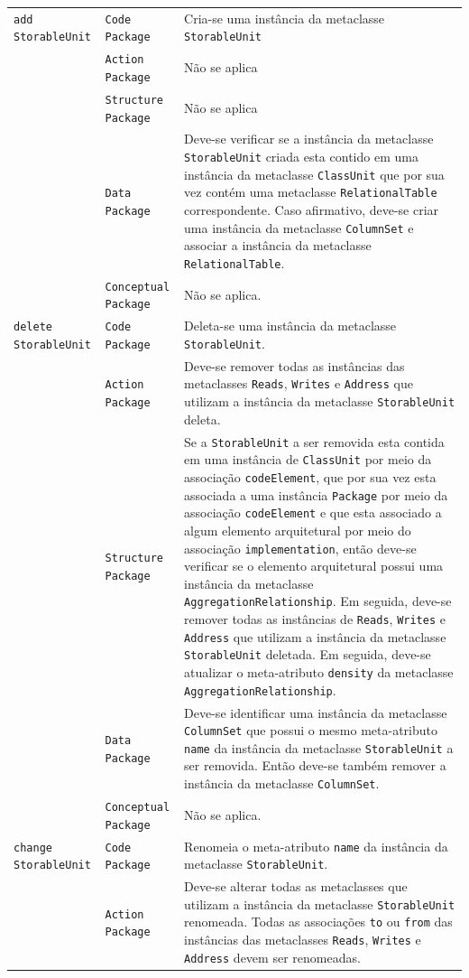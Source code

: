 \begin{longtable}{ | m{1.9cm} | m{3.57cm}| m{9.3cm} | }
 \texttt{add} \texttt{StorableUnit} & \texttt{Code Package} & Cria-se uma instância da metaclasse \texttt{StorableUnit}\tabularnewline
\cline{2-3} 
\cline{2-3} 
 & \texttt{Action Package} & Não se aplica \tabularnewline
 \cline{2-3} 
 & \texttt{Structure Package} & Não se aplica \tabularnewline
\cline{2-3} 
 & \texttt{Data Package} & Deve-se verificar se a instância da metaclasse \texttt{StorableUnit} criada esta contido em uma instância da metaclasse \texttt{ClassUnit} que por sua vez contém uma metaclasse \texttt{RelationalTable} correspondente. Caso afirmativo, deve-se criar uma instância da metaclasse \texttt{ColumnSet} e associar a instância da metaclasse \texttt{RelationalTable}. \tabularnewline
\cline{2-3} 
 & \texttt{Conceptual Package} & Não se aplica. \tabularnewline
\hline 
 \texttt{delete} \texttt{StorableUnit} & \texttt{Code Package} & Deleta-se uma instância da metaclasse \texttt{StorableUnit}.\tabularnewline
\cline{2-3} 
& \texttt{Action Package} & Deve-se remover todas as instâncias das metaclasses \texttt{Reads}, \texttt{Writes} e \texttt{Address} que utilizam a instância da metaclasse \texttt{StorableUnit} deleta. \tabularnewline
\cline{2-3}
& \texttt{Structure Package} & Se a \texttt{StorableUnit} a ser removida esta contida em uma instância de \texttt{ClassUnit} por meio da associação \texttt{codeElement}, que por sua vez esta associada a uma instância \texttt{Package} por meio da associação \texttt{codeElement} e que esta associado a algum elemento arquitetural por meio do associação \texttt{implementation}, então deve-se verificar se o elemento arquitetural possui uma instância da metaclasse \texttt{AggregationRelationship}. Em seguida, deve-se remover todas as instâncias de \texttt{Reads}, \texttt{Writes} e \texttt{Address} que utilizam a instância da metaclasse \texttt{StorableUnit} deletada. Em seguida, deve-se atualizar o meta-atributo \texttt{density} da metaclasse \texttt{AggregationRelationship}. \tabularnewline
\cline{2-3}
& \texttt{Data Package} & Deve-se identificar uma instância da metaclasse \texttt{ColumnSet} que possui o mesmo meta-atributo \texttt{name} da instância da metaclasse \texttt{StorableUnit} a ser removida. Então deve-se também remover a instância da metaclasse \texttt{ColumnSet}. \tabularnewline
\cline{2-3}
& \texttt{Conceptual Package} & Não se aplica. \tabularnewline
\hline
\texttt{change} \texttt{StorableUnit} & \texttt{Code Package} & Renomeia o meta-atributo \texttt{name} da instância da metaclasse \texttt{StorableUnit}.\tabularnewline
\cline{2-3}
& \texttt{Action Package} & Deve-se alterar todas as metaclasses que utilizam a instância da metaclasse \texttt{StorableUnit} renomeada. Todas as associações \texttt{to} ou \texttt{from} das instâncias das metaclasses \texttt{Reads}, \texttt{Writes} e \texttt{Address} devem ser renomeadas. \tabularnewline

\end{longtable}
